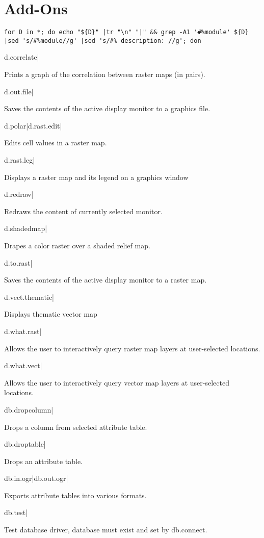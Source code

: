 
\section{Add-Ons}

\begin{lstlisting}
for D in *; do echo "${D}" |tr "\n" "|" && grep -A1 '#%module' ${D} |sed 's/#%module//g' |sed 's/#% description: //g'; don
\end{lstlisting}


d.correlate|

Prints a graph of the correlation between raster maps (in pairs).

d.out.file|

Saves the contents of the active display monitor to a graphics file.

d.polar|d.rast.edit|

Edits cell values in a raster map.

d.rast.leg|

Displays a raster map and its legend on a graphics window

d.redraw|

Redraws the content of currently selected monitor.

d.shadedmap|

Drapes a color raster over a shaded relief map.

d.to.rast|

Saves the contents of the active display monitor to a raster map.

d.vect.thematic|

Displays thematic vector map

d.what.rast|

Allows the user to interactively query raster map layers at user-selected
locations.

d.what.vect|

Allows the user to interactively query vector map layers at user-selected
locations.

db.dropcolumn|

Drops a column from selected attribute table.

db.droptable|

Drops an attribute table.

db.in.ogr|db.out.ogr|

Exports attribute tables into various formats.

db.test|

Test database driver, database must exist and set by db.connect.

